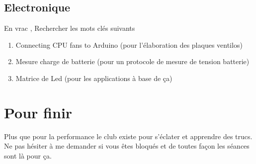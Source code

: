 \documentclass[fleqn,10pt]{SelfArx} %
\begin{document}
\subsection{Electronique}
En vrac , Rechercher les mots clés suivants

\begin{enumerate}[noitemsep] %
	\item Connecting CPU fans to Arduino (pour l'élaboration des plaques ventilos)
	\item Mesure charge de batterie (pour un protocole de mesure de tension batterie)
	\item Matrice de Led (pour les applications à base de ça)
\end{enumerate}


\section*{Pour finir} %


Plus que pour la performance le club existe pour s'éclater et apprendre des trucs. Ne pas hésiter à me demander si vous êtes bloqués et de toutes façon les séances sont là pour ça.


\end{document}
